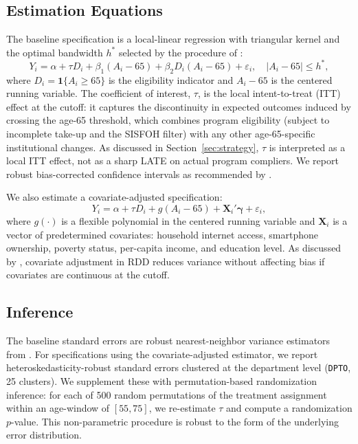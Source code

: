 \documentclass[12pt]{article}
\begin{document}
\subsection{Estimation Equations}

The baseline specification is a local-linear regression with triangular kernel and the optimal bandwidth $h^*$ selected by the procedure of \citet{calonico2014}:
\begin{equation}
Y_i = \alpha + \tau D_i + \beta_1 (A_i - 65) + \beta_2 D_i (A_i - 65) + \varepsilon_i,
\quad |A_i - 65| \le h^*,
\label{eq:rdd}
\end{equation}
where $D_i = \mathbf{1}\{A_i \ge 65\}$ is the eligibility indicator and $A_i - 65$ is the centered running variable. The coefficient of interest, $\tau$, is the local intent-to-treat (ITT) effect at the cutoff: it captures the discontinuity in expected outcomes induced by crossing the age-65 threshold, which combines program eligibility (subject to incomplete take-up and the SISFOH filter) with any other age-65-specific institutional changes. As discussed in Section~\ref{sec:strategy}, $\tau$ is interpreted as a local ITT effect, not as a sharp LATE on actual program compliers. We report robust bias-corrected confidence intervals as recommended by \citet{calonico2014}.

We also estimate a covariate-adjusted specification:
\begin{equation}
Y_i = \alpha + \tau D_i + g(A_i - 65) + \mathbf{X}_i' \boldsymbol{\gamma} + \varepsilon_i,
\label{eq:rdd_covariates}
\end{equation}
where $g(\cdot)$ is a flexible polynomial in the centered running variable and $\mathbf{X}_i$ is a vector of predetermined covariates: household internet access, smartphone ownership, poverty status, per-capita income, and education level. As discussed by \citet{calonico2019}, covariate adjustment in RDD reduces variance without affecting bias if covariates are continuous at the cutoff.

\subsection{Inference}

The baseline standard errors are robust nearest-neighbor variance estimators from \citet{calonico2014}. For specifications using the covariate-adjusted estimator, we report heteroskedasticity-robust standard errors clustered at the department level (\texttt{DPTO}, 25 clusters). We supplement these with permutation-based randomization inference: for each of 500 random permutations of the treatment assignment within an age-window of $[55, 75]$, we re-estimate $\tau$ and compute a randomization $p$-value. This non-parametric procedure is robust to the form of the underlying error distribution.
\end{document}
